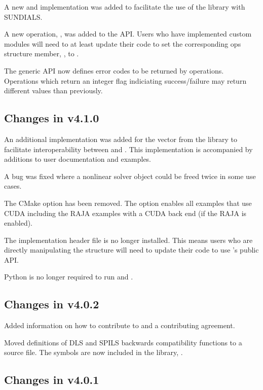 A new {\sunmatrix} and {\sunlinsol} implementation was added to facilitate 
the use of the {\superludist} library with SUNDIALS.

A new operation, , was added to the {\sunmatrix} API. Users
who have implemented custom {\sunmatrix} modules will need to at least update
their code to set the corresponding ops structure member, , to .

The generic {\sunmatrix} API now defines error codes to be returned by {\sunmatrix} operations.
Operations which return an integer flag indiciating success/failure may return different
values than previously. 

\subsection*{Changes in v4.1.0}

An additional {\nvector} implementation was added for the
{\tpetra} vector from the {\trilinos} library to facilitate interoperability
between {\sundials} and {\trilinos}. This implementation is accompanied by
additions to user documentation and {\sundials} examples.

A bug was fixed where a nonlinear solver object could be freed twice in some use
cases.

The  CMake option has been removed. The option 
enables all examples that use CUDA including the RAJA examples with a CUDA back end (if the RAJA
{\nvector} is enabled).

The implementation header file  is no longer installed. This means users
who are directly manipulating the  structure will need to update their code
to use {\cvode}'s public API.

Python is no longer required to run  and .

\subsection*{Changes in v4.0.2}

Added information on how to contribute to {\sundials} and a contributing agreement.

Moved definitions of DLS and SPILS backwards compatibility functions to a source file.
The symbols are now included in the {\cvode} library, .

\subsection*{Changes in v4.0.1}

